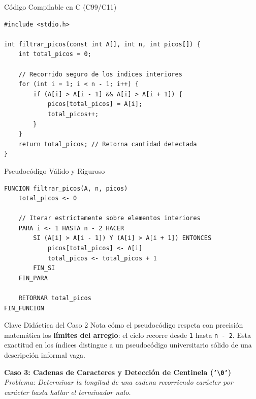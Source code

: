 \documentclass[11pt,letterpaper]{article}
\begin{document}
\begin{cbox}{Código Compilable en C (C99/C11)}
\begin{lstlisting}[style=customc]
#include <stdio.h>

int filtrar_picos(const int A[], int n, int picos[]) {
    int total_picos = 0;

    // Recorrido seguro de los indices interiores
    for (int i = 1; i < n - 1; i++) {
        if (A[i] > A[i - 1] && A[i] > A[i + 1]) {
            picos[total_picos] = A[i];
            total_picos++;
        }
    }
    return total_picos; // Retorna cantidad detectada
}
\end{lstlisting}
\end{cbox}

\vspace{0.25cm}

\begin{pseudobox}{Pseudocódigo Válido y Riguroso}
\begin{lstlisting}[style=pseudocodigo]
FUNCION filtrar_picos(A, n, picos)
    total_picos <- 0

    // Iterar estrictamente sobre elementos interiores
    PARA i <- 1 HASTA n - 2 HACER
        SI (A[i] > A[i - 1]) Y (A[i] > A[i + 1]) ENTONCES
            picos[total_picos] <- A[i]
            total_picos <- total_picos + 1
        FIN_SI
    FIN_PARA

    RETORNAR total_picos
FIN_FUNCION
\end{lstlisting}
\end{pseudobox}

\vspace{0.2cm}
\begin{conceptbox}{Clave Didáctica del Caso 2}
\small
Nota cómo el pseudocódigo respeta con precisión matemática los \textbf{límites del arreglo}: el ciclo recorre desde \texttt{1} hasta \texttt{n - 2}. Esta exactitud en los índices distingue a un pseudocódigo universitario sólido de una descripción informal vaga.
\end{conceptbox}

\newpage
\noindent \textbf{Caso 3: Cadenas de Caracteres y Detección de Centinela (\texttt{'\textbackslash 0'})} \\
\small \textit{Problema: Determinar la longitud de una cadena recorriendo carácter por carácter hasta hallar el terminador nulo.}
\vspace{0.15cm}
\end{document}
